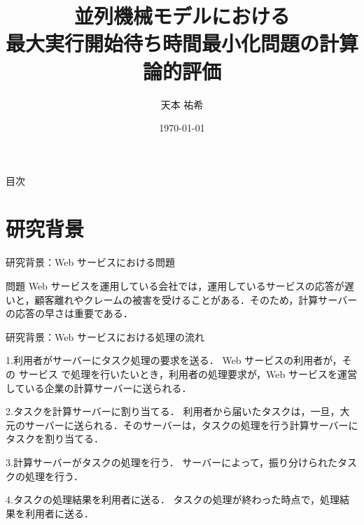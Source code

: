 \documentclass[dvipdfmx]{beamer}
\title{並列機械モデルにおける\\最大実行開始待ち時間最小化問題の計算論的評価}
\author{天本 祐希}
\institute{青山学院大学 宋研究室}
\date{\today}
\begin{document}
\begin{frame}
  \titlepage
\end{frame}

\begin{frame}{目次}
  \tableofcontents
\end{frame}
\section{研究背景}

\begin{frame}{研究背景：Web サービスにおける問題}
  \begin{block}{問題}
    Web サービスを運用している会社では，運用しているサービスの応答が遅いと，顧客離れやクレームの被害を受けることがある．そのため，計算サーバーの応答の早さは重要である．
  \end{block}
\end{frame}

\begin{frame}{研究背景：Web サービスにおける処理の流れ}
  \begin{block}{1.利用者がサーバーにタスク処理の要求を送る．}
    Web サービスの利用者が，その サービス で処理を行いたいとき，利用者の処理要求が，Web サービスを運営している企業の計算サーバーに送られる．
  \end{block}

  \begin{block}{2.タスクを計算サーバーに割り当てる．}
    利用者から届いたタスクは，一旦，大元のサーバーに送られる．そのサーバーは，タスクの処理を行う計算サーバーにタスクを割り当てる．
  \end{block}

  \begin{block}{3.計算サーバーがタスクの処理を行う．}
    サーバーによって，振り分けられたタスクの処理を行う．
  \end{block}

  \begin{block}{4.タスクの処理結果を利用者に送る．}
    タスクの処理が終わった時点で，処理結果を利用者に送る．
  \end{block}
\end{frame}
\end{document}
